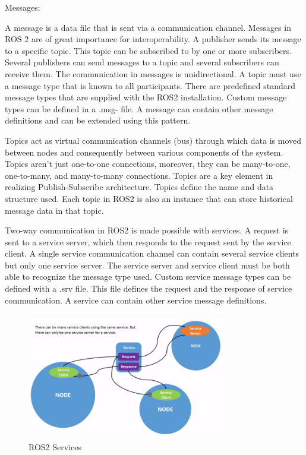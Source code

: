 	\begin{labeling}{Messages:}
		\item [Messages:] 
		A message is a data file that is sent via a communication channel. Messages in ROS 2 are of great importance for interoperability. A publisher sends its message to a specific topic. This topic can be subscribed to by one or more subscribers. Several publishers can send messages to a topic and several subscribers can receive them. The communication in messages is unidirectional. A topic must use a message type that is known to all participants. There are predefined standard message types that are supplied with the ROS2 installation. Custom message types can be defined in a .msg- file. A message can contain other message definitions and can be extended using this pattern.\cite*{ros2Tutorials}
		
		\item [Topics:] 
		Topics act as virtual communication channels (bus) through which data is moved between nodes and consequently between various components of the system. Topics aren't just one-to-one connections, moreover, they can be many-to-one, one-to-many, and many-to-many connections. Topics are a key element in realizing Publish-Subscribe architecture.
		Topics define the name and data structure used. Each topic in ROS2 is also an instance that can store historical message data in that topic.

		\item [Service:] 
		Two-way communication in ROS2 is made possible with services. A request is sent to a service server, which then responds to the request sent by the service client. A single service communication channel can contain several service clients but only one service server. The service server and service client must be both able to recognize the message type used. Custom service message types can be defined with a .srv file. This file defines the request and the response of service communication. A service can contain other service message definitions.
		\begin{figure}[H]
			\centering
			\includegraphics[width=0.8\textwidth]{"Bilder/ros-services.png"}
			\caption{ROS2 Services \cite{ros2Tutorials}}
			\label{fig:Background:Ros2Services}					
		\end{figure}
		

\end{labeling}
